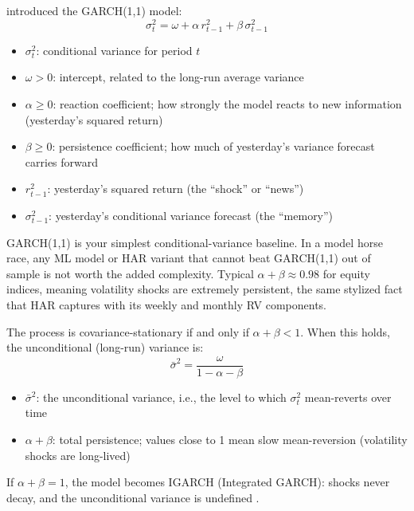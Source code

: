 \citet{bollerslev1986} introduced the GARCH(1,1) model:
%
\begin{equation}
\label{eq:garch11}
\sigma^2_t = \omega + \alpha \, r^2_{t-1} + \beta \, \sigma^2_{t-1}
\end{equation}
%
\begin{itemize}[nosep]
  \item $\sigma^2_t$: conditional variance for period $t$
  \item $\omega > 0$: intercept, related to the long-run average variance
  \item $\alpha \geq 0$: reaction coefficient; how strongly the model reacts to
        new information (yesterday's squared return)
  \item $\beta \geq 0$: persistence coefficient; how much of yesterday's variance
        forecast carries forward
  \item $r^2_{t-1}$: yesterday's squared return (the ``shock'' or ``news'')
  \item $\sigma^2_{t-1}$: yesterday's conditional variance forecast (the ``memory'')
\end{itemize}

\begin{projectconnection}
GARCH(1,1) is your simplest conditional-variance baseline. In a model horse race,
any ML model or HAR variant that cannot beat GARCH(1,1) out of sample is not worth
the added complexity. Typical $\alpha + \beta \approx 0.98$ for equity indices,
meaning volatility shocks are extremely persistent, the same stylized fact that HAR
captures with its weekly and monthly RV components.
\end{projectconnection}

\begin{definition}
\label{def:garch-stationarity}
The process is covariance-stationary if and only if
$\alpha + \beta < 1$. When this holds, the unconditional (long-run) variance is:
%
\begin{equation}
\label{eq:garch-uncond}
\bar{\sigma}^2 = \frac{\omega}{1 - \alpha - \beta}
\end{equation}
%
\begin{itemize}[nosep]
  \item $\bar{\sigma}^2$: the unconditional variance, i.e., the level to which
        $\sigma^2_t$ mean-reverts over time
  \item $\alpha + \beta$: total persistence; values close to 1 mean slow
        mean-reversion (volatility shocks are long-lived)
\end{itemize}
If $\alpha + \beta = 1$, the model becomes IGARCH (Integrated GARCH): shocks
never decay, and the unconditional variance is undefined
\citep{engle1986}.
\end{definition}

